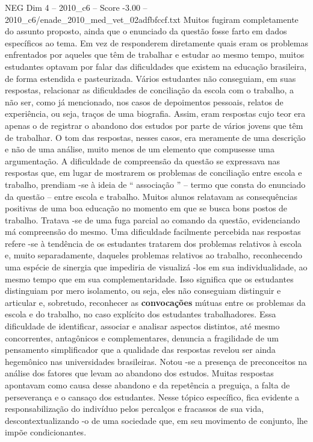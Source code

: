 \begin{textsample}{NEG Dim 4 – 2010\_c6 – Score -3.00 – 2010\_c6/enade\_2010\_med\_vet\_02adfbfccf.txt}
Muitos fugiram completamente do assunto proposto, ainda que o enunciado da questão fosse farto em dados específicos ao tema.
Em vez de responderem diretamente quais eram os problemas enfrentados por aqueles que têm de trabalhar e estudar ao mesmo tempo, muitos estudantes optavam por falar das dificuldades que existem na educação brasileira, de forma estendida e pasteurizada.
Vários estudantes não conseguiam, em suas respostas, relacionar as dificuldades de conciliação da escola com o trabalho, a não ser, como já mencionado, nos casos de depoimentos pessoais, relatos de experiência, ou seja, traços de uma biografia.
Assim, eram respostas cujo teor era apenas o de registrar o abandono dos estudos por parte de vários jovens que têm de trabalhar.
O tom das respostas, nesses casos, era meramente de uma descrição e não de uma análise, muito menos de um elemento que compusesse uma argumentação.
A dificuldade de compreensão da questão se expressava nas respostas que, em lugar de mostrarem os problemas de conciliação entre escola e trabalho, prendiam -se à ideia de “ associação ” – termo que consta do enunciado da questão – entre escola e trabalho.
Muitos alunos relatavam as consequências positivas de uma boa educação no momento em que se busca bons postos de trabalho.
Tratava -se de uma fuga parcial ao comando da questão, evidenciando má compreensão do mesmo.
Uma dificuldade facilmente percebida nas respostas refere -se à tendência de os estudantes tratarem dos problemas relativos à escola e, muito separadamente, daqueles problemas relativos ao trabalho, reconhecendo uma espécie de sinergia que impediria de visualizá -los em sua individualidade, ao mesmo tempo que em sua complementaridade.
Isso significa que os estudantes distinguiam por mero isolamento, ou seja, eles não conseguiam distinguir e articular e, sobretudo, reconhecer as \textbf{convocações} mútuas entre os problemas da escola e do trabalho, no caso explícito dos estudantes trabalhadores.
Essa dificuldade de identificar, associar e analisar aspectos distintos, até mesmo concorrentes, antagônicos e complementares, denuncia a fragilidade de um pensamento simplificador que a qualidade das respostas revelou ser ainda hegemônico nas universidades brasileiras.
Notou -se a presença de preconceitos na análise dos fatores que levam ao abandono dos estudos.
Muitas respostas apontavam como causa desse abandono e da repetência a preguiça, a falta de perseverança e o cansaço dos estudantes.
Nesse tópico específico, fica evidente a responsabilização do indivíduo pelos percalços e fracassos de sua vida, descontextualizando -o de uma sociedade que, em seu movimento de conjunto, lhe impõe condicionantes.

\end{textsample}
